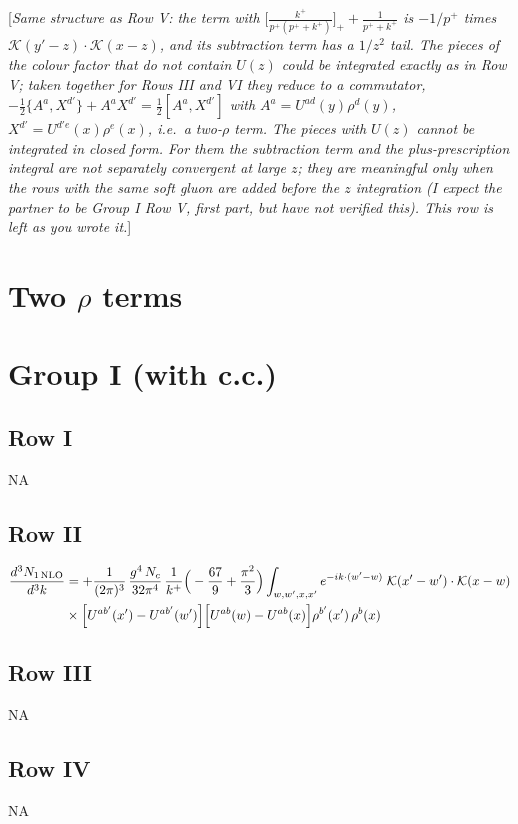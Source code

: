\documentclass[9pt]{article}
\numberwithin{equation}{section}
\newcommand{\rnote}[1]{{\color{teal}[\textit{#1}]}}
\begin{document}
\rnote{Same structure as Row V: the term with $\big[\frac{k^{+}}{p^{+}(p^{+}+k^{+})}\big]_{+}+\frac{1}{p^{+}+k^{+}}$ is $-1/p^{+}$ times $\mathcal{K}(y'-z)\cdot\mathcal{K}(x-z)$, and its subtraction term has a $1/z^{2}$ tail. The pieces of the colour factor that do not contain $U(z)$ could be integrated exactly as in Row V; taken together for Rows III and VI they reduce to a commutator, $-\frac{1}{2}\{A^{a},X^{d'}\}+A^{a}X^{d'}=\frac{1}{2}[A^{a},X^{d'}]$ with $A^{a}=U^{ad}(y)\rho^{d}(y)$, $X^{d'}=U^{d'e}(x)\rho^{e}(x)$, i.e.\ a two-$\rho$ term. The pieces with $U(z)$ cannot be integrated in closed form. For them the subtraction term and the plus-prescription integral are not separately convergent at large $z$; they are meaningful only when the rows with the same soft gluon are added before the $z$ integration (I expect the partner to be Group I Row V, first part, but have not verified this). This row is left as you wrote it.}

\section*{Two $\rho$ terms}
\section{Group I (with c.c.)}
\subsection{Row I}
\textsc{NA}
\subsection{Row II}
\begin{align}
\frac{d^{3}N_{1\,\rm NLO}}{d^{3}k} & = +\frac{1}{(2\pi)^{3}}\,\frac{g^{4}\,N_{c}}{32\pi^{4}}\,\frac{1}{k^{+}}\Big(-\frac{67}{9}+\frac{\pi^{2}}{3}\Big)\int_{w,w',x,x'} e^{-ik\cdot(w'-w)}\;\mathcal{K}(x'-w')\cdot\mathcal{K}(x-w)\notag \\
& \times\Big[U^{ab'}(x')-U^{ab'}(w')\Big]\Big[U^{ab}(w)-U^{ab}(x)\Big]\rho^{b'}(x')\,\rho^{b}(x)
\end{align}
\subsection{Row III}
\textsc{NA}
\subsection{Row IV}
\textsc{NA}
\end{document}
